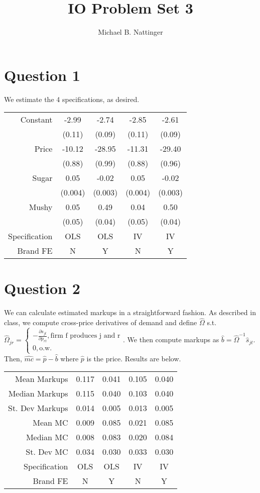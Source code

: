 \documentclass[11pt]{article} %
\title{IO Problem Set 3}
\author{Michael B. Nattinger}
\begin{document}
\maketitle
\section{Question 1}
We estimate the 4 specifications, as desired.

\begin{center}
\begin{tabular}{r |c c c c}
\hline \hline
Constant & -2.99 & -2.74 & -2.85 & -2.61 \\
 & (0.11) & (0.09) & (0.11) & (0.09) \\
Price & -10.12 & -28.95 & -11.31 & -29.40 \\
 & (0.88) & (0.99) & (0.88) & (0.96) \\
Sugar & 0.05 & -0.02 & 0.05 & -0.02 \\
 & (0.004) & (0.003) & (0.004) & (0.003) \\
Mushy & 0.05 & 0.49 & 0.04 & 0.50 \\
 & (0.05) & (0.04) & (0.05) & (0.04) \\
\hline
Specification & OLS & OLS & IV & IV \\
Brand FE & N & Y & N & Y \\
\hline
\end{tabular}
\end{center}

\section{Question 2}
We can calculate estimated markups in a straightforward fashion. As described in class, we compute cross-price derivatives of demand and define $\hat{\Omega}$ s.t. $\hat{\Omega}_{jr} = \begin{cases} - \frac{\partial s_{jt}}{\partial p_{rt}}, \text{firm f produces j and r} \\ 0 , \text{o.w.} \end{cases}.$ We then compute markups as $\hat{b} = \hat{\Omega}^{-1} \hat{s}_{jt}$. Then, $\hat{mc} = \hat{p} - \hat{b}$ where $\hat{p}$ is the price. Results are below.

\begin{center}
\begin{tabular}{r |c c c c}
\hline \hline
Mean Markups & 0.117 & 0.041 & 0.105 & 0.040 \\
Median Markups & 0.115 & 0.040 & 0.103 & 0.040 \\
St. Dev Markups & 0.014 & 0.005 & 0.013 & 0.005 \\
Mean MC & 0.009 & 0.085 & 0.021 & 0.085 \\
Median MC & 0.008 & 0.083 & 0.020 & 0.084 \\
St. Dev MC & 0.034 & 0.030 & 0.033 & 0.030 \\
\hline
Specification & OLS & OLS & IV & IV \\
Brand FE & N & Y & N & Y \\
\hline
\end{tabular}
\end{center}
\end{document}
